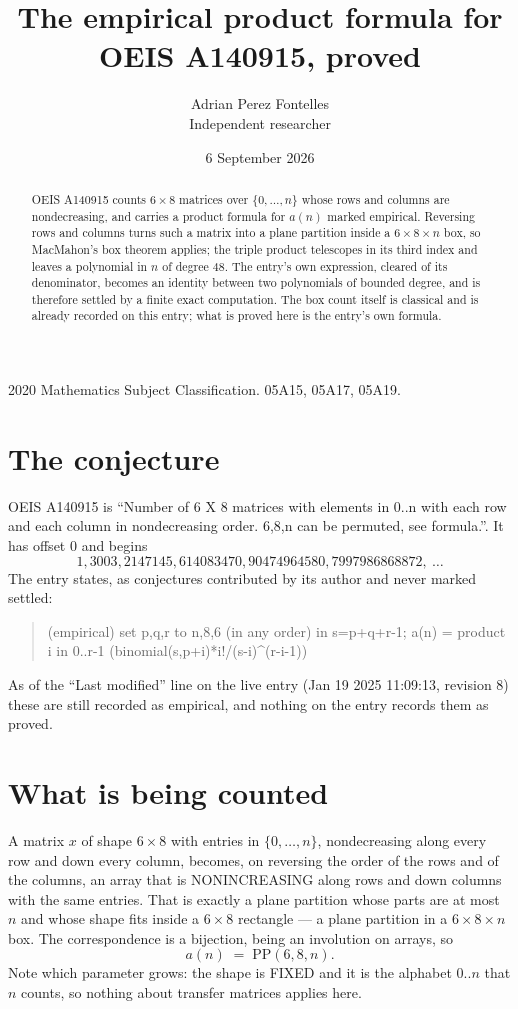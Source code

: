 \documentclass[11pt,a4paper]{article}
\title{The empirical product formula for OEIS A140915, proved}
\author{Adrian Perez Fontelles\\ \small Independent researcher}
\date{6 September 2026}
\theoremstyle{plain}
\theoremstyle{definition}
\begin{document}
\maketitle

\begin{abstract}
OEIS A140915 counts $6\times8$ matrices over $\{0,\dots,n\}$ whose rows and columns are
nondecreasing, and carries a product formula for $a(n)$ marked empirical. Reversing rows and
columns turns such a matrix into a plane partition inside a $6\times8\times n$ box, so
MacMahon's box theorem applies; the triple product telescopes in its third index and leaves a
polynomial in $n$ of degree $48$. The entry's own expression, cleared of its denominator,
becomes an identity between two polynomials of bounded degree, and is therefore settled by a
finite exact computation. The box count itself is classical and is already recorded on this
entry; what is proved here is the entry's own formula.
\end{abstract}

\noindent\small 2020 Mathematics Subject Classification. 05A15, 05A17, 05A19.\normalsize

\section{The conjecture}

OEIS A140915 is ``Number of 6 X 8 matrices with elements in 0..n with each row and each column in nondecreasing order. 6,8,n can be permuted, see formula.''. It has offset $0$ and begins
\[
1, 3003, 2147145, 614083470, 90474964580, 7997986868872,\ \dots
\]
The entry states, as conjectures contributed by its author and never marked settled:
\begin{quote}
(empirical) set p,q,r to n,8,6 (in any order) in s=p+q+r-1; a(n) = product {i in 0..r-1} (binomial(s,p+i)*i!/(s-i)\^{}(r-i-1))

\end{quote}
As of the ``Last modified'' line on the live entry (Jan 19 2025 11:09:13, revision 8) these are still
recorded as empirical, and nothing on the entry records them as proved.

\section{What is being counted}

A matrix $x$ of shape $6\times8$ with entries in $\{0,\dots,n\}$, nondecreasing along
every row and down every column, becomes, on reversing the order of the rows and of the
columns, an array that is NONINCREASING along rows and down columns with the same entries. That
is exactly a plane partition whose parts are at most $n$ and whose shape fits inside a
$6\times8$ rectangle --- a plane partition in a $6\times8\times n$ box. The
correspondence is a bijection, being an involution on arrays, so
\[
a(n)\;=\;\mathrm{PP}(6,8,n).
\]
Note which parameter grows: the shape is FIXED and it is the alphabet $0..n$ that $n$ counts,
so nothing about transfer matrices applies here.
\end{document}
